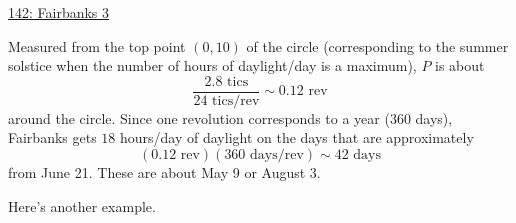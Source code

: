 \documentclass{ximera}
\begin{document}
\begin{example}
\begin{explanation}
\begin{enumerate}
\href{https://www.desmos.com/calculator/xvy6s6aw41}{142: Fairbanks 3}

Measured from the top point $(0,10)$ of the circle (corresponding to the summer solstice when the number of hours of daylight/day is a maximum), $P$ is about
\[
      \frac{2.8\text{ tics}}{24\text{ tics/rev}} \sim 0.12\text{ rev}
\]
around the circle. Since one revolution corresponds to a year (360 days), Fairbanks gets $18$ hours/day of daylight on the days that are approximately
\[ 
   ( 0.12\text{ rev}) ( 360 \text{ days/rev}   )  \sim 42\text{ days}
\]
from June 21. These are about May 9 or August 3.

\end{enumerate}
\end{explanation}

\end{example}


Here's another example.
\end{document}
